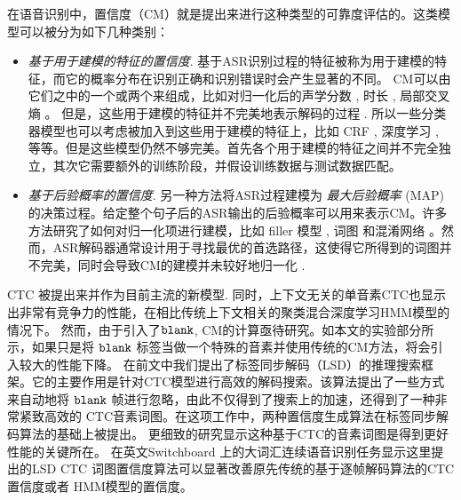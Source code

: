在语音识别中，置信度（CM）就是提出来进行这种类型的可靠度评估的\cite{jiang2005confidence}。这类模型可以被分为如下几种类别：

\begin{itemize}
    \item {\em 基于用于建模的特征的置信度}.
    基于ASR识别过程的特征被称为用于建模的特征，而它的概率分布在识别正确和识别错误时会产生显著的不同。
    CM可以由它们之中的一个或两个来组成，比如对归一化后的声学分数 \cite{hu2013new}, 时长 \cite{ma2011fusing}, 局部交叉熵 \cite{falavigna2002acoustic}。
    但是，这些用于建模的特征并不完美地表示解码的过程 \cite{jiang2005confidence}. 所以一些分类器模型也可以考虑被加入到这些用于建模的特征上，比如 CRF \cite{seigel2013confidence}, 深度学习 \cite{yu2011calibration}, 等等。但是这些模型仍然不够完美。首先各个用于建模的特征之间并不完全独立，其次它需要额外的训练阶段，并假设训练数据与测试数据匹配。

    \item {\em 基于后验概率的置信度}.
    另一种方法将ASR过程建模为 {\em 最大后验概率} (MAP) 的决策过程。给定整个句子后的ASR输出的后验概率可以用来表示CM。许多方法研究了如何对归一化项进行建模，比如 filler 模型 \cite{young1994detecting}, 词图\cite{wessel2001confidence} 和混淆网络 \cite{evermann2000large}。然而，ASR解码器通常设计用于寻找最优的首选路径，这使得它所得到的词图并不完美，同时会导致CM的建模并未较好地归一化 \cite{yu2006maximum}.

\end{itemize}

CTC\cite{graves2006connectionist} 被提出来并作为目前主流的新模型\cite{fernandez2008phoneme}\cite{sainath2015acoustic}\cite{amodei2015deep}\cite{sak2015fast}.
同时，上下文无关的单音素CTC也显示出非常有竞争力的性能，在相比传统上下文相关的聚类混合深度学习HMM模型\cite{sak2015fast}\cite{miao2015eesen}\cite{miao2016ctc}\cite{mcgraw2016personalized}的情况下。
然而，由于引入了$\tt blank$, CM的计算亟待研究。如本文的实验部分所示，如果只是将 $\tt blank$ 标签当做一个特殊的音素并使用传统的CM方法，将会引入较大的性能下降。
在前文中我们提出了标签同步解码（LSD）的推理搜索框架。它的主要作用是针对CTC模型进行高效的解码搜索。该算法提出了一些方式来自动地将 $\tt blank$ 帧进行忽略，由此不仅得到了搜索上的加速，还得到了一种非常紧致高效的 CTC音素词图。在这项工作中，两种置信度生成算法在标签同步解码算法的基础上被提出。
更细致的研究显示这种基于CTC的音素词图是得到更好性能的关键所在。
在英文Switchboard 上的大词汇连续语音识别任务显示这里提出的LSD CTC 词图置信度算法可以显著改善原先传统的基于逐帧解码算法的CTC置信度或者 HMM模型的置信度。


